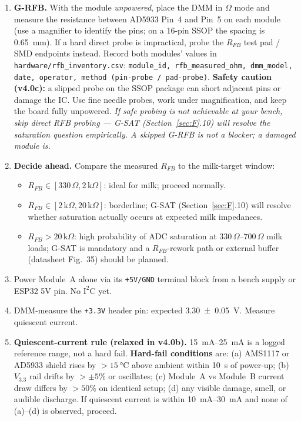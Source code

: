 \documentclass[11pt,a4paper]{article}
\newcommand{\kohm}[1]{\ensuremath{#1\,\mathrm{k}\Omega}}
\newcommand{\Rohm}[1]{\ensuremath{#1\,\Omega}}
\begin{document}
\begin{enumerate}
\item \textbf{G-RFB.} With the module \emph{unpowered}, place the DMM in $\Omega$ mode and measure the resistance between AD5933 Pin~4 and Pin~5 on each module (use a magnifier to identify the pins; on a 16-pin SSOP the spacing is \SI{0.65}{\milli\meter}). If a hard direct probe is impractical, probe the $R_{FB}$ test pad / SMD endpoints instead. Record both modules' values in \texttt{hardware/rfb\_inventory.csv}: \texttt{module\_id, rfb\_measured\_ohm, dmm\_model, date, operator, method (pin-probe / pad-probe)}. \textbf{Safety caution (v4.0c):} a slipped probe on the SSOP package can short adjacent pins or damage the IC. Use fine needle probes, work under magnification, and keep the board fully unpowered. \emph{If safe probing is not achievable at your bench, skip direct RFB probing --- G-SAT (Section~\ref{sec:F}.10) will resolve the saturation question empirically. A skipped G-RFB is not a blocker; a damaged module is.}
\item \textbf{Decide ahead.} Compare the measured $R_{FB}$ to the milk-target window:
\begin{itemize}
\item $R_{FB} \in [\Rohm{330}, \kohm{2}]$: ideal for milk; proceed normally.
\item $R_{FB} \in [\kohm{2}, \kohm{20}]$: borderline; G-SAT (Section~\ref{sec:F}.10) will resolve whether saturation actually occurs at expected milk impedances.
\item $R_{FB} > \kohm{20}$: high probability of ADC saturation at $\Rohm{330}$--$\Rohm{700}$ milk loads; G-SAT is mandatory and a $R_{FB}$-rework path or external buffer (datasheet Fig.~35) should be planned.
\end{itemize}
\item Power Module~A alone via its \texttt{+5V/GND} terminal block from a bench supply or ESP32 5V pin. No $\mathrm{I^2C}$ yet.
\item DMM-measure the \texttt{+3.3V} header pin: expected \SI{3.30 \pm 0.05}{\volt}. Measure quiescent current.
\item \textbf{Quiescent-current rule (relaxed in v4.0b).} \SIrange{15}{25}{\milli\ampere} is a logged reference range, not a hard fail. \textbf{Hard-fail conditions} are: (a) AMS1117 or AD5933 shield rises by $>\SI{15}{\celsius}$ above ambient within \SI{10}{\second} of power-up; (b) $V_{3.3}$ rail drifts by $>\pm 5\%$ or oscillates; (c) Module~A vs Module~B current draw differs by $>50\%$ on identical setup; (d) any visible damage, smell, or audible discharge. If quiescent current is within \SIrange{10}{30}{\milli\ampere} and none of (a)--(d) is observed, proceed.

\end{enumerate}
\end{document}

